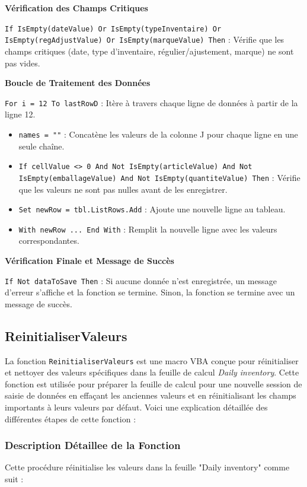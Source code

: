 \documentclass[a4paper, oneside, 12pt, final]{extreport}
\begin{document}
\textbf{Vérification des Champs Critiques}

\texttt{If IsEmpty(dateValue) Or IsEmpty(typeInventaire) Or IsEmpty(regAdjustValue) Or IsEmpty(marqueValue) Then} : Vérifie que les champs critiques (date, type d'inventaire, régulier/ajustement, marque) ne sont pas vides.

\textbf{Boucle de Traitement des Données}

\texttt{For i = 12 To lastRowD} : Itère à travers chaque ligne de données à partir de la ligne 12.

\begin{itemize}
    \item \texttt{names = ""} : Concatène les valeurs de la colonne J pour chaque ligne en une seule chaîne.
    \item \texttt{If cellValue <> 0 And Not IsEmpty(articleValue) And Not IsEmpty(emballageValue) And Not IsEmpty(quantiteValue) Then} : Vérifie que les valeurs ne sont pas nulles avant de les enregistrer.
    \item \texttt{Set newRow = tbl.ListRows.Add} : Ajoute une nouvelle ligne au tableau.
    \item \texttt{With newRow ... End With} : Remplit la nouvelle ligne avec les valeurs correspondantes.
\end{itemize}

\textbf{Vérification Finale et Message de Succès}

\texttt{If Not dataToSave Then} : Si aucune donnée n'est enregistrée, un message d'erreur s'affiche et la fonction se termine. Sinon, la fonction se termine avec un message de succès.

\subsection{ReinitialiserValeurs}

La fonction \texttt{ReinitialiserValeurs} est une macro VBA conçue pour réinitialiser et nettoyer des valeurs spécifiques dans la feuille de calcul \textit{Daily inventory}. Cette fonction est utilisée pour préparer la feuille de calcul pour une nouvelle session de saisie de données en effaçant les anciennes valeurs et en réinitialisant les champs importants à leurs valeurs par défaut. Voici une explication détaillée des différentes étapes de cette fonction :

\subsubsection{Description Détaillee de la Fonction}
Cette procédure réinitialise les valeurs dans la feuille "Daily inventory" comme suit :
\end{document}
